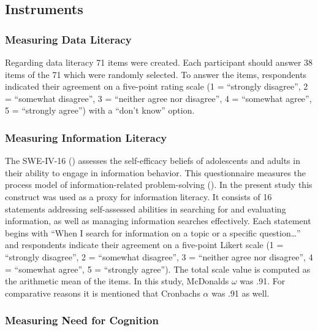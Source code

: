 \documentclass[
  12pt,
  a4paper,
  twoside]{article}
\begin{document}
\subsection{Instruments}\label{instruments}

\subsubsection{Measuring Data Literacy}\label{measuring-data-literacy}

Regarding data literacy 71 items were created.
Each participant should answer 38 items of the 71 which were randomly selected.
To answer the items, respondents indicated their agreement on a five-point rating
scale (1 = ``strongly disagree'', 2 = ``somewhat disagree'', 3 = ``neither agree nor disagree'', 4 = ``somewhat agree'', 5 = ``strongly agree'') with a ``don't know'' option.

\subsubsection{Measuring Information Literacy}\label{measuring-information-literacy}

The SWE-IV-16 () assesses the self-efficacy beliefs of adolescents and adults in their ability to engage in information behavior.
This questionnaire measures the process model of information-related problem-solving
(). In the present study this construct was used as a proxy for information literacy.
It consists of 16 statements addressing self-assessed abilities in searching for and evaluating information, as well as managing
information searches effectively.
Each statement begins with ``When I search for information on a topic or a specific question\ldots{}'' and respondents indicate their
agreement on a five-point Likert scale (1 = ``strongly disagree'', 2 = ``somewhat disagree'', 3 = ``neither agree nor disagree'', 4 = ``somewhat agree'', 5 = ``strongly agree''). The total scale value is computed as the arithmetic mean of the items.
In this study, McDonalds \(\omega\) was .91. For comparative reasons it is mentioned that Cronbachs \(\alpha\) was .91 as well.

\subsubsection{Measuring Need for Cognition}\label{measuring-need-for-cognition}
\end{document}
